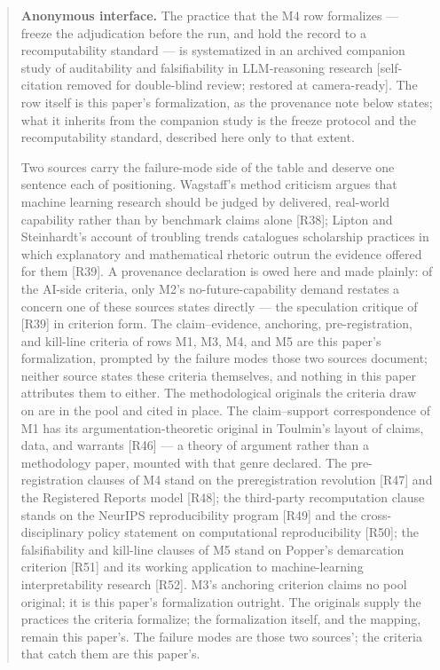 \documentclass[11pt,a4paper]{article}
\begin{document}
\begin{abstract}
\textbf{Anonymous interface.} The practice that the M4 row formalizes — freeze the adjudication before the run, and hold the record to a recomputability standard — is systematized in an archived companion study of auditability and falsifiability in LLM-reasoning research [self-citation removed for double-blind review; restored at camera-ready]. The row itself is this paper's formalization, as the provenance note below states; what it inherits from the companion study is the freeze protocol and the recomputability standard, described here only to that extent.

Two sources carry the failure-mode side of the table and deserve one sentence each of positioning. Wagstaff's method criticism argues that machine learning research should be judged by delivered, real-world capability rather than by benchmark claims alone [R38]; Lipton and Steinhardt's account of troubling trends catalogues scholarship practices in which explanatory and mathematical rhetoric outrun the evidence offered for them [R39]. A provenance declaration is owed here and made plainly: of the AI-side criteria, only M2's no-future-capability demand restates a concern one of these sources states directly — the speculation critique of [R39] in criterion form. The claim–evidence, anchoring, pre-registration, and kill-line criteria of rows M1, M3, M4, and M5 are this paper's formalization, prompted by the failure modes those two sources document; neither source states these criteria themselves, and nothing in this paper attributes them to either. The methodological originals the criteria draw on are in the pool and cited in place. The claim–support correspondence of M1 has its argumentation-theoretic original in Toulmin's layout of claims, data, and warrants [R46] — a theory of argument rather than a methodology paper, mounted with that genre declared. The pre-registration clauses of M4 stand on the preregistration revolution [R47] and the Registered Reports model [R48]; the third-party recomputation clause stands on the NeurIPS reproducibility program [R49] and the cross-disciplinary policy statement on computational reproducibility [R50]; the falsifiability and kill-line clauses of M5 stand on Popper's demarcation criterion [R51] and its working application to machine-learning interpretability research [R52]. M3's anchoring criterion claims no pool original; it is this paper's formalization outright. The originals supply the practices the criteria formalize; the formalization itself, and the mapping, remain this paper's. The failure modes are those two sources'; the criteria that catch them are this paper's.


\end{abstract}
\end{document}
